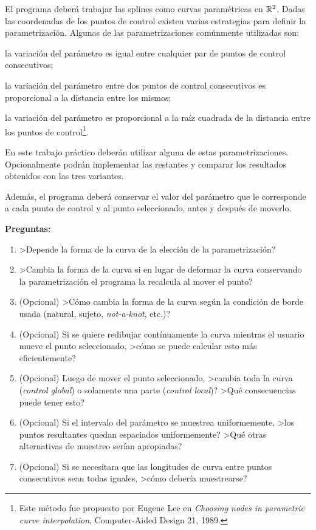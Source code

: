 El programa deber\'a trabajar las splines como curvas param\'etricas en $\mathbb{R}^2$. Dadas las coordenadas de los puntos de control existen varias estrategias para definir la parametrizaci\'on. Algunas de las parametrizaciones com\'unmente utilizadas son:
\vspace{-15pt}
\begin{description}
  \setlength{\itemsep}{0pt}
  \setlength{\parskip}{0pt}
  \setlength{\parsep}{0pt}
 \item[Uniforme:] la variaci\'on del par\'ametro es igual entre cualquier par de puntos de control consecutivos;
 \item[\emph{Chord-length}:] la variaci\'on del par\'ametro entre dos puntos de control consecutivos es proporcional a la distancia entre los mismos;
 \item[Centr\'ipeta:] la variaci\'on del par\'ametro es proporcional a la ra\'iz cuadrada de la distancia entre los puntos de control\footnote{Este m\'etodo fue propuesto por Eugene Lee en \emph{Choosing nodes in parametric curve interpolation}, Computer-Aided Design 21, 1989.}.
\end{description}
\vspace{-15pt}
En este trabajo pr\'actico deber\'an utilizar alguna de estas parametrizaciones. Opcionalmente podr\'an implementar las restantes y comparar los resultados obtenidos con las tres variantes.

Adem\'as, el programa deber\'a conservar el valor del par\'ametro que le corresponde a cada punto de control y al punto seleccionado, antes y despu\'es de moverlo. 

{\bf Preguntas:}
\vspace{-15pt}
\begin{enumerate}
  \setlength{\itemsep}{0pt}
  \setlength{\parskip}{0pt}
  \setlength{\parsep}{0pt}
 \item >Depende la forma de la curva de la elecci\'on de la parametrizaci\'on? 
 \item >Cambia la forma de la curva si en lugar de deformar la curva conservando la parametrizaci\'on el programa la recalcula al mover el punto?
 \item (Opcional) >C\'omo cambia la forma de la curva seg\'un la condici\'on de borde usada (natural, sujeto, \textit{not-a-knot}, etc.)? 
 \item (Opcional) Si se quiere redibujar cont\'inuamente la curva mientras el usuario mueve el punto seleccionado, >c\'omo se puede calcular esto m\'as eficientemente?
 \item (Opcional) Luego de mover el punto seleccionado, >cambia toda la curva (\emph{control global}) o solamente una parte (\emph{control local})? >Qu\'e consecuencias puede tener esto?
 \item (Opcional) Si el intervalo del par\'ametro se muestrea uniformemente, >los puntos resultantes quedan espaciados uniformemente? >Qu\'e otras alternativas de muestreo ser\'ian apropiadas? 
 \item (Opcional) Si se necesitara que las longitudes de curva entre puntos consecutivos sean todas iguales, >c\'omo deber\'ia muestrearse?
\end{enumerate}

